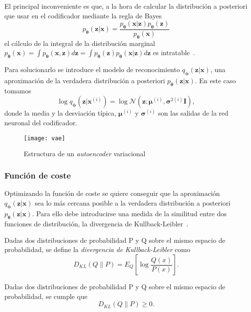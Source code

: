 El principal inconveniente es que, a la hora de calcular la distribución a posteriori que usar en el codificador mediante la regla de Bayes $$ p_{\boldsymbol{\theta}}(\textbf{z}|\textbf{x}) = \frac{p_{\boldsymbol{\theta}}(\textbf{x}|\textbf{z})p_{\boldsymbol{\theta}}(\textbf{z})}{p_{\boldsymbol{\theta}}(\textbf{x})}$$ el cálculo de la integral de la distribución marginal $p_{\boldsymbol{\theta}}(\textbf{x}) = \int p_{\boldsymbol{\theta}}(\textbf{x},\textbf{z})d\textbf{z} = \int p_{\boldsymbol{\theta}}(\textbf{z})p_{\boldsymbol{\theta}}(\textbf{x}|\textbf{z})d\textbf{z}$ es intratable~\cite{kingma2019introduction}.

Para solucionarlo se introduce el modelo de reconocimiento $q_{\boldsymbol{\phi}}(\textbf{z}|\textbf{x})$, una aproximación de la verdadera distribución a posteriori $p_{\boldsymbol{\theta}}(\textbf{z}|\textbf{x})$. En este caso tomamos $$\log q_{\boldsymbol{\phi}}(\textbf{z}|\textbf{x}^{(i)}) = \log \mathcal{N}(\textbf{z};\boldsymbol{\mu}^{(i)},\boldsymbol{\sigma}^{2(i)}\textbf{I}),$$ donde la media y la desviación típica, $\boldsymbol{\mu}^{(i)}$ y $\boldsymbol{\sigma}^{(i)}$ son las salidas de la red neuronal del codificador.

\begin{figure}[htpb]
  \centering
  \texttt{[image: vae]}
  \caption{Estructura de un \textit{autoencoder} variacional}
  \label{fig:vae}
\end{figure}

\subsubsection{Función de coste}

Optimizando la función de coste se quiere conseguir que la aproximación $q_{\boldsymbol{\phi}}(\textbf{z}|\textbf{x})$ sea lo más cercana posible a la verdadera distribución a posteriori $p_{\boldsymbol{\theta}}(\textbf{z}|\textbf{x})$. Para ello debe introducirse una medida de la similitud entre dos funciones de distribución, la divergencia de Kullback-Leibler~\cite{kullback1997information}.

\begin{definicion}Dadas dos distribuciones de probabilidad P y Q sobre el mismo espacio de probabilidad, se define la \textit{divergencia de Kullback-Leibler} como $$D_{KL}(Q \parallel P) = E_Q \left[ \log \frac{Q(x)}{P(x)} \right].$$
\end{definicion}

\begin{proposicion}Dadas dos distribuciones de probabilidad P y Q sobre el mismo espacio de probabilidad, se cumple que $$D_{KL}(Q \parallel P) \geq 0.$$
\end{proposicion}\label{DKL-norm}

